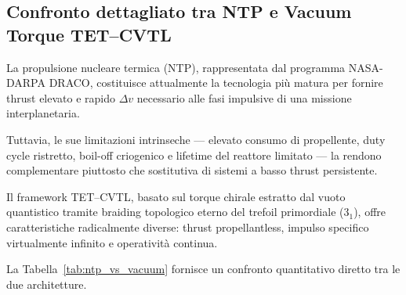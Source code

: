 \documentclass[11pt,a4paper]{article}
\let\oldref\ref
\renewcommand{\ref}{\protect\oldref}
\theoremstyle{plain}
\theoremstyle{definition}
\begin{document}
\vspace{0.4cm}



\subsection{Confronto dettagliato tra NTP e Vacuum Torque TET--CVTL}

\vspace{0.2cm}

La propulsione nucleare termica (NTP), rappresentata dal programma NASA-DARPA DRACO, costituisce attualmente la tecnologia più matura per fornire thrust elevato e rapido $\Delta v$ necessario alle fasi impulsive di una missione interplanetaria. 


\vspace{0.3cm}


Tuttavia, le sue limitazioni intrinseche — elevato consumo di propellente, duty cycle ristretto, boil-off criogenico e lifetime del reattore limitato — la rendono complementare piuttosto che sostitutiva di sistemi a basso thrust persistente.



\vspace{0.3cm}

Il framework TET--CVTL, basato sul torque chirale estratto dal vuoto quantistico tramite braiding topologico eterno del trefoil primordiale ($3_1$), offre caratteristiche radicalmente diverse: thrust propellantless, impulso specifico virtualmente infinito e operatività continua. 


\vspace{0.3cm}


La Tabella~\ref{tab:ntp_vs_vacuum} fornisce un confronto quantitativo diretto tra le due architetture.

\vspace{0.3cm}
\end{document}
